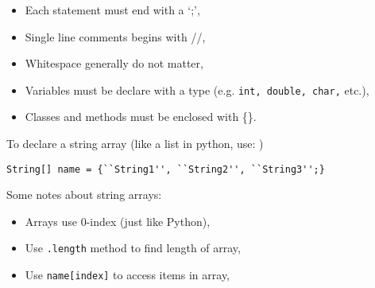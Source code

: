 \documentclass{tufte-handout}
\begin{document}
    \begin{itemize}
        \item Each statement must end with a `;',
        \item Single line comments begins with //,
        \item Whitespace generally do not matter,
        \item Variables must be declare with a type (e.g. \texttt{int, double, char,} etc.),
        \item Classes and methods must be enclosed with \{\}.
    \end{itemize}

    To declare a string array (like a list in python, use: )
    \begin{lstlisting}
String[] name = {``String1'', ``String2'', ``String3'';}
    \end{lstlisting}

    Some notes about string arrays:
    \begin{itemize}
        \item Arrays use 0-index (just like Python),
        \item Use \texttt{.length} method to find length of array,
        \item Use \texttt{name[index]} to access items in array,
    \end{itemize}
\end{document}
